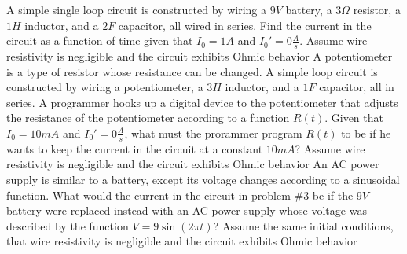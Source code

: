 \documentclass{exam}
\begin{document}
\begin{questions}
        \question A simple single loop circuit is constructed by wiring a $9V$ battery, a $3\Omega$ resistor, a $1H$ inductor, and a $2F$ capacitor, all wired in series. Find the current in the circuit as a function of time given that $I_0=1A$ and $I_0'=0\frac{A}{s}$. Assume wire resistivity is negligible and the circuit exhibits Ohmic behavior
        \vspace{4in}
        \question A potentiometer is a type of resistor whose resistance can be changed. A simple loop circuit is constructed by wiring a potentiometer, a $3H$ inductor, and a $1F$ capacitor, all in series. A programmer hooks up a digital device to the potentiometer that adjusts the resistance of the potentiometer according to a function $R(t)$. Given that $I_0=10mA$ and $I_0'=0\frac{A}{s}$, what must the prorammer program $R(t)$ to be if he wants to keep the current in the circuit at a constant $10mA$? Assume wire resistivity is negligible and the circuit exhibits Ohmic behavior
        \vspace{2in}
        \question An AC power supply is similar to a battery, except its voltage changes according to a sinusoidal function. What would the current in the circuit in problem \#3 be if the $9V$ battery were replaced instead with an AC power supply whose voltage was described by the function $V=9\sin(2\pi t)$? Assume the same initial conditions, that wire resistivity is negligible and the circuit exhibits Ohmic behavior
    \end{questions}
\end{document}
